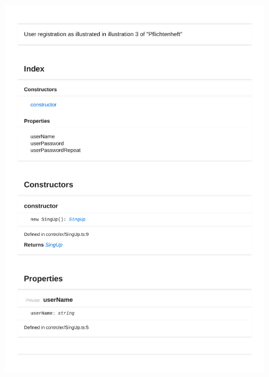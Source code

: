 \begin{figure}[H]
\centerline{\includegraphics[width=\textwidth]{FrontendDocsAsPDF/Model/SignUp.pdf}}
\end{figure}

